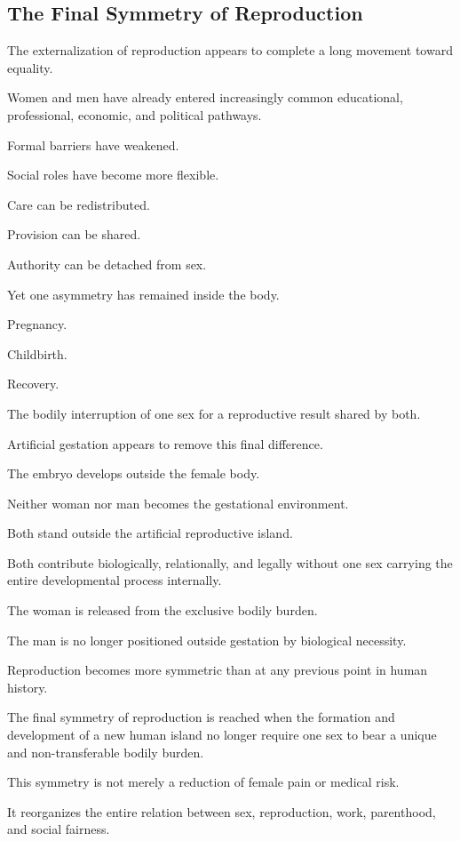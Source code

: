 \subsection*{\textbf{The Final Symmetry of Reproduction}}


The externalization of reproduction appears to complete a long movement toward equality.

Women and men have already entered increasingly common educational, professional, economic, and political pathways.

Formal barriers have weakened.

Social roles have become more flexible.

Care can be redistributed.

Provision can be shared.

Authority can be detached from sex.

Yet one asymmetry has remained inside the body.

Pregnancy.

Childbirth.

Recovery.

The bodily interruption of one sex for a reproductive result shared by both.

Artificial gestation appears to remove this final difference.

The embryo develops outside the female body.

Neither woman nor man becomes the gestational environment.

Both stand outside the artificial reproductive island.

Both contribute biologically, relationally, and legally without one sex carrying the entire developmental process internally.

The woman is released from the exclusive bodily burden.

The man is no longer positioned outside gestation by biological necessity.

Reproduction becomes more symmetric than at any previous point in human history.

The final symmetry of reproduction is reached when the formation and development of a new human island no longer require one sex to bear a unique and non-transferable bodily burden.

This symmetry is not merely a reduction of female pain or medical risk.

It reorganizes the entire relation between sex, reproduction, work, parenthood, and social fairness.

